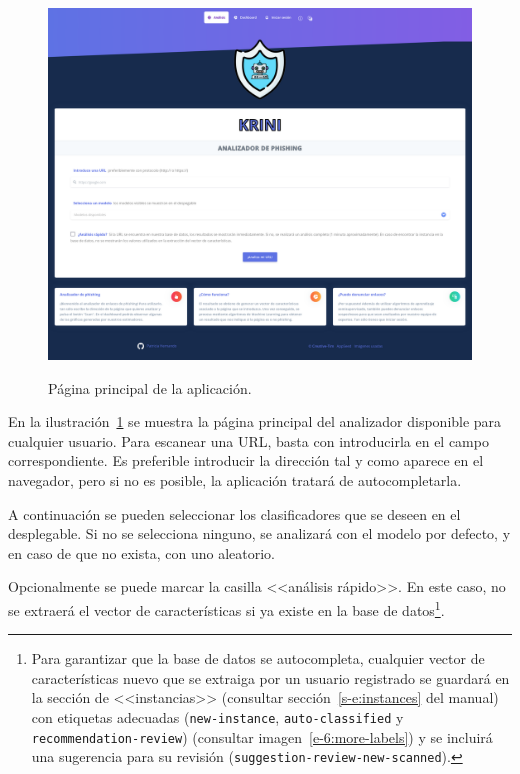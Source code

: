 \begin{figure}[h]
	\caption[Manual de usuario: página principal]{Página principal de la aplicación.}
	\centering
	\includegraphics[width=\textwidth]{../img/anexos/user_guide/1_index}
	\label{e-1:index}
\end{figure}

En la ilustración~\ref{e-1:index} se muestra la página principal del analizador disponible para cualquier usuario. Para escanear una URL, basta con introducirla en el campo correspondiente. Es preferible introducir la dirección tal y como aparece en el navegador, pero si no es posible, la aplicación tratará de autocompletarla.

A continuación se pueden seleccionar los clasificadores que se deseen en el desplegable. Si no se selecciona ninguno, se analizará con el modelo por defecto, y en caso de que no exista, con uno aleatorio.

Opcionalmente se puede marcar la casilla <<análisis rápido>>. En este caso, no se extraerá el vector de características si ya existe en la base de datos\footnote{Para garantizar que la base de datos se autocompleta, cualquier vector de características nuevo que se extraiga por un usuario registrado se guardará en la sección de <<instancias>> (consultar sección~\ref{s-e:instances} del manual) con etiquetas adecuadas (\texttt{new-instance}, \texttt{auto-classified} y \texttt{recommendation-review}) (consultar imagen~\ref{e-6:more-labels}) y se incluirá una sugerencia para su revisión (\texttt{suggestion-review-new-scanned}).}.
 
